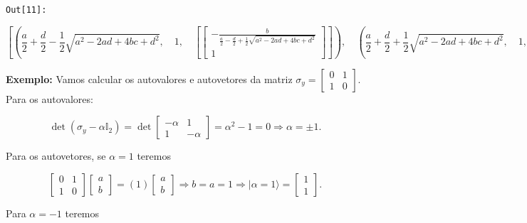 \documentclass[11pt]{article}
\begin{document}
\texttt{\color{outcolor}Out[{\color{outcolor}11}]:}
    
    $$\left [ \left ( \frac{a}{2} + \frac{d}{2} - \frac{1}{2} \sqrt{a^{2} - 2 a d + 4 b c + d^{2}}, \quad 1, \quad \left [ \left[\begin{matrix}- \frac{b}{\frac{a}{2} - \frac{d}{2} + \frac{1}{2} \sqrt{a^{2} - 2 a d + 4 b c + d^{2}}}\\1\end{matrix}\right]\right ]\right ), \quad \left ( \frac{a}{2} + \frac{d}{2} + \frac{1}{2} \sqrt{a^{2} - 2 a d + 4 b c + d^{2}}, \quad 1, \quad \left [ \left[\begin{matrix}- \frac{b}{\frac{a}{2} - \frac{d}{2} - \frac{1}{2} \sqrt{a^{2} - 2 a d + 4 b c + d^{2}}}\\1\end{matrix}\right]\right ]\right )\right ]$$

    

    \textbf{Exemplo:} Vamos calcular os autovalores e autovetores da matriz
\(\sigma_{y}=\begin{bmatrix}0&1\\1&0\end{bmatrix}\). Para os
autovalores:

\begin{equation}
\det(\sigma_{y}-\alpha\mathbb{I}_{2}) = \det\begin{bmatrix}-\alpha&1\\1&-\alpha\end{bmatrix}=\alpha^{2}-1=0\Rightarrow \alpha=\pm 1.
\end{equation}

Para os autovetores, se \(\alpha=1\) teremos

\begin{equation}
\begin{bmatrix}0&1\\1&0\end{bmatrix}\begin{bmatrix}a\\b\end{bmatrix}=(1)\begin{bmatrix}a\\b\end{bmatrix}\Rightarrow b=a=1\Rightarrow |\alpha=1\rangle = \begin{bmatrix}1\\1\end{bmatrix}.
\end{equation}

Para \(\alpha=-1\) teremos
\end{document}
